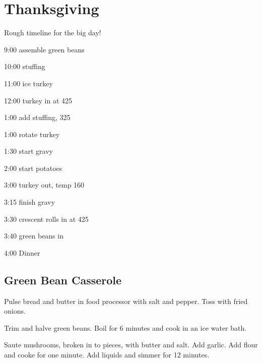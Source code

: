 \section{Thanksgiving}
\begin{recipe}

Rough timeline for the big day!

9:00 assemble green beans

10:00 stuffing

11:00 ice turkey

12:00 turkey in at 425

1:00 add stuffing, 325

1:00 rotate turkey

1:30 start gravy

2:00 start potatoes

3:00 turkey out, temp 160

3:15 finish gravy

3:30 crescent rolls in at 425

3:40 green beans in

4:00 Dinner

\subsection{Green Bean Casserole}


Pulse bread and butter in food processor with salt and pepper. Toss with fried onions.


Trim and halve green beans. Boil for 6 minutes and cook in an ice water bath.


Saute mushrooms, broken in to pieces, with butter and salt. Add garlic. Add flour and cooke for one minute. Add liquids and simmer for 12 minutes.


\end{recipe}
